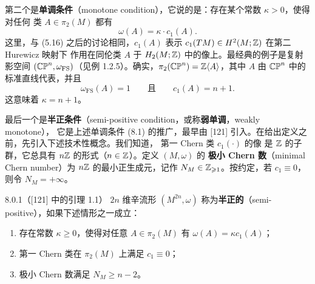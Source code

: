 第二个是\textbf{单调条件}（monotone condition），它说的是：存在某个常数 $\kappa>0$，使得对任何
类 $A\in\pi_2(M)$ 都有
\begin{equation}\tag{8.1}
  \omega(A)=\kappa\cdot c_1(A).
\end{equation}
这里，与 (5.16) 之后的讨论相同，$c_1(A)$ 表示 $c_1(TM)\in H^2(M;\mathbb{Z})$ 在第二 Hurewicz 映射下
作用在同伦类 $A$ 于 $H_2(M;\mathbb{Z})$ 中的像上。最经典的例子是复射影空间
$(\mathbb{CP}^n,\omega_{\mathrm{FS}})$（见例 1.2.5）。确实，$\pi_2(\mathbb{CP}^n)=\mathbb{Z}\langle A\rangle$，其中 $A$
由 $\mathbb{CP}^n$ 中的标准直线代表，并且
\begin{equation}\tag{8.2}
  \omega_{\mathrm{FS}}(A)=1\qquad\text{且}\qquad c_1(A)=n+1.
\end{equation}
这意味着 $\kappa=n+1$。

最后一个是\textbf{半正条件}（semi-positive condition，或称\textbf{弱单调}，weakly monotone），
它是上述单调条件 (8.1) 的推广，最早由 [121] 引入。在给出定义之前，先引入下述技术性概念。我们知道，
第一 Chern 类 $c_1(\cdot)$ 的像
是 $\mathbb{Z}$ 的子群，它总具有 $n\mathbb{Z}$ 的形式（$n\in\mathbb{Z}$）。定义 $(M,\omega)$ 的
\textbf{极小 Chern 数}（minimal Chern number）为 $n\mathbb{Z}$ 的最小正生成元，记作
$N_M\in\mathbb{Z}_{\geqslant1}$。按约定，若 $c_1\equiv0$，则令 $N_M=+\infty$。

\begin{wdefn}{8.0.1}（[121] 中的引理 1.1）
  $2n$ 维辛流形 $(M^{2n},\omega)$ 称为\textbf{半正的}（semi-positive），如果下述情形之一成立：
  \begin{enumerate}[label=(\roman*)]
    \item 存在常数 $\kappa\geqslant0$，使得对任意 $A\in\pi_2(M)$ 有
          $\omega(A)=\kappa c_1(A)$；
    \item 第一 Chern 类在 $\pi_2(M)$ 上满足 $c_1\equiv0$；
    \item 极小 Chern 数满足 $N_M\geqslant n-2$。
  \end{enumerate}
\end{wdefn}

